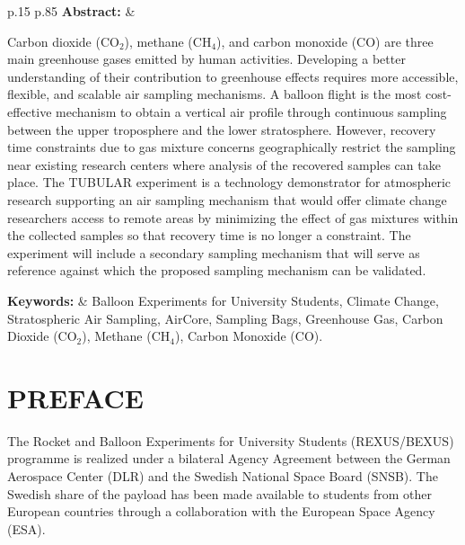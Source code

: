 \documentclass[a4paper,12pt,twoside]{article}
\begin{document}
\vspace{1cm}
\begin{tabular}{p{} p{}}
\textbf{Abstract:}     &  %



Carbon dioxide (CO$_{2}$), methane (CH$_{4}$), and carbon monoxide (CO) are three main greenhouse gases emitted by human activities. Developing a better understanding of their contribution to greenhouse effects requires more accessible, flexible, and scalable air sampling mechanisms. A balloon flight is the most cost-effective mechanism to obtain a vertical air profile through continuous sampling between the upper troposphere and the lower stratosphere. However, recovery time constraints due to gas mixture concerns geographically restrict the sampling near existing research centers where analysis of the recovered samples can take place. The TUBULAR experiment is a technology demonstrator for atmospheric research supporting an air sampling mechanism that would offer climate change researchers access to remote areas by minimizing the effect of gas mixtures within the collected samples so that recovery time is no longer a constraint. The experiment will include a secondary sampling mechanism that will serve as reference against which the proposed sampling mechanism can be validated.

\textbf{Keywords:}     & %
Balloon Experiments for University Students, Climate Change, Stratospheric Air Sampling, AirCore, Sampling Bags, Greenhouse Gas, Carbon Dioxide (CO$_{2}$), Methane (CH$_{4}$), Carbon Monoxide (CO).
\end{tabular}

\vfill

\newpage
\tableofcontents

\newpage
\section*{PREFACE} \markboth{}{}

The Rocket and Balloon Experiments for University Students (REXUS/BEXUS) programme is realized under a bilateral Agency Agreement between the German Aerospace Center (DLR) and the Swedish National Space Board (SNSB). The Swedish share of the
payload has been made available to students from other European countries through a collaboration with the European Space Agency (ESA).
\end{document}

